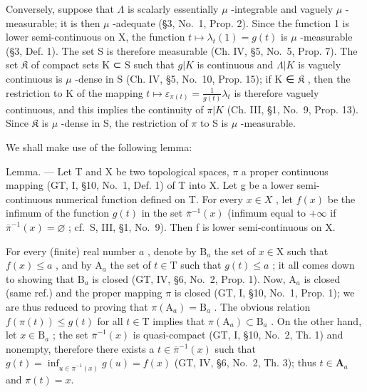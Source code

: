 Conversely, suppose that \(\Lambda\) is scalarly essentially \(\mu\) -integrable and vaguely \(\mu\) -measurable; it is then \(\mu\) -adequate (§3, No.~1, Prop. 2). Since the function 1 is lower semi-continuous on X, the function \(t \mapsto \lambda_t(1) = g(t)\) is \(\mu\) -measurable (§3, Def. 1). The set S is therefore measurable (Ch. IV, §5, No.~5, Prop. 7). The set \(\mathfrak{K}\) of compact sets K ⊂ S such that \(g|K\) is continuous and \(\Lambda|K\) is vaguely continuous is \(\mu\) -dense in S (Ch. IV, §5, No.~10, Prop. 15); if K ∈ \(\mathfrak{K}\) , then the restriction to K of the mapping \(t \mapsto \varepsilon_{\pi(t)} = \frac{1}{g(t)} \lambda_t\) is therefore vaguely continuous, and this implies the continuity of \(\pi|K\) (Ch. III, §1, No.~9, Prop. 13). Since \(\mathfrak{K}\) is \(\mu\) -dense in S, the restriction of \(\pi\) to S is \(\mu\) -measurable.

We shall make use of the following lemma:

Lemma. --- Let T and X be two topological spaces, \(\pi\) a proper continuous mapping (GT, I, §10, No.~1, Def. 1) of T into X. Let g be a lower semi-continuous numerical function defined on T. For every \(x \in X\) , let \(f(x)\) be the infimum of the function \(g(t)\) in the set \(\overline{\pi}^{-1}(x)\) (infimum equal to \(+\infty\) if \(\overline{\pi}^{-1}(x) = \varnothing\) ; cf.~S, III, §1, No.~9). Then f is lower semi-continuous on X.

For every (finite) real number \(a\) , denote by \(\mathrm{B}_a\) the set of \(x \in \mathrm{X}\) such that \(f(x) \leqslant a\) , and by \(\mathrm{A}_a\) the set of \(t \in \mathrm{T}\) such that \(g(t) \leqslant a\) ; it all comes down to showing that \(\mathrm{B}_a\) is closed (GT, IV, §6, No.~2, Prop. 1). Now, \(\mathrm{A}_a\) is closed (same ref.) and the proper mapping \(\pi\) is closed (GT, I, §10, No.~1, Prop. 1); we are thus reduced to proving that \(\pi(\mathrm{A}_a) = \mathrm{B}_a\) . The obvious relation \(f(\pi(t)) \leqslant g(t)\) for all \(t \in \mathrm{T}\) implies that \(\pi(\mathrm{A}_a) \subset \mathrm{B}_a\) . On the other hand, let \(x \in \mathrm{B}_a\) ; the set \(\overline{\pi}^{-1}(x)\) is quasi-compact (GT, I, §10, No.~2, Th. 1) and nonempty, therefore there exists a \(t \in \overline{\pi}^{-1}(x)\) such that \(g(t) = \inf_{u\in \overline{\pi}^{-1} (x)}g(u) = f(x)\) (GT, IV, §6, No.~2, Th. 3); thus \(t\in \mathbf{A}_a\) and \(\pi (t) = x\).

